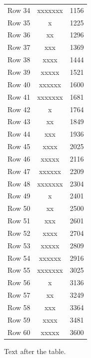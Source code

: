 \documentclass{article}
\begin{document}
\begin{longtable}{|l|c|r|}
Row 34 & xxxxxxx & 1156 \\
Row 35 & x & 1225 \\
Row 36 & xx & 1296 \\
Row 37 & xxx & 1369 \\
Row 38 & xxxx & 1444 \\
Row 39 & xxxxx & 1521 \\
Row 40 & xxxxxx & 1600 \\
Row 41 & xxxxxxx & 1681 \\
Row 42 & x & 1764 \\
Row 43 & xx & 1849 \\
Row 44 & xxx & 1936 \\
Row 45 & xxxx & 2025 \\
Row 46 & xxxxx & 2116 \\
Row 47 & xxxxxx & 2209 \\
Row 48 & xxxxxxx & 2304 \\
Row 49 & x & 2401 \\
Row 50 & xx & 2500 \\
Row 51 & xxx & 2601 \\
Row 52 & xxxx & 2704 \\
Row 53 & xxxxx & 2809 \\
Row 54 & xxxxxx & 2916 \\
Row 55 & xxxxxxx & 3025 \\
Row 56 & x & 3136 \\
Row 57 & xx & 3249 \\
Row 58 & xxx & 3364 \\
Row 59 & xxxx & 3481 \\
Row 60 & xxxxx & 3600 \\
\end{longtable}

Text after the table.
\end{document}
